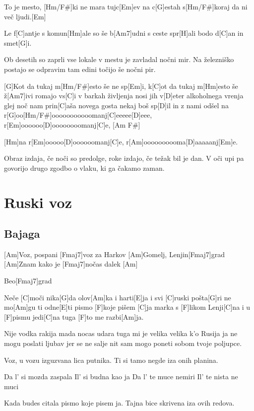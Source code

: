 \documentclass[a4paper,12pt]{article}
\begin{document}
\begin{multicols}{2}
\begin{guitar}
[G]To je mesto, [Hm/F#]ki ne mara tujc[Em]ev
na c[G]estah s[Hm/F#]koraj da ni več ljudi.[Em]

Le f[C]antje s komun[Hm]ale so še b[Am7]udni
s ceste spr[H]ali bodo d[C]an in smet[G]i.
 

Ob desetih so zaprli vse lokale
v mestu je zavladal nočni mir.
Na železniško postajo se odpravim
tam edini točijo še nočni pir.


[G]Kot da tukaj m[Hm/F#]esto še ne sp[Em]i,
k[C]ot da tukaj m[Hm]esto še ž[Am7]ivi
romajo vs[C]i v barkah življenja
nosi jih v[D]eter alkoholnega vrenja
glej noč nam prin[C]aša novega gosta
nekaj boš sp[D]il in z nami odšel
na r[G]oo[Hm/F#]ooooooooooomanj[C]eeeee[D]eee,
r[Em]oooooo[D]oooooooomanj[C]e, [Am F#]

[Hm]na r[Em]ooooo[D]oooooomanj[C]e,
r[Am]oooooooooma[D]aaaaanj[Em]e.


Obraz izdaja, če noči so predolge,
roke izdajo, če težak bil je dan.
V oči upi pa govorijo drugo zgodbo
o vlaku, ki ga čakamo zaman.



\end{guitar}
\section{Ruski voz}
\subsection*{Bajaga}
\begin{guitar}
[Am  Fmaj7]

           
[Am]Voz, pospani [Fmaj7]voz za Harkov
[Am]Gomelj, Lenjin[Fmaj7]grad
[Am]Znam kako je [Fmaj7]nočas dalek [Am]

Beo[Fmaj7]grad



Neče [C]moči nika[G]da olov[Am]ka i harti[E]ja
i svi [C]ruski pošta[G]ri ne mo[Am]gu ti odne[E]ti
pismo [F]koje pišem [C]ja marka s [F]likom Lenji[C]na
i u [F]pismu jedi[C]na tuga [F]to me razbi[Am]ja.


Nije vodka rakija mada nocas udara
tuga mi je velika velika k'o Rusija
ja ne mogu poslati ljubav jer se ne salje
nit sam mogo poneti sobom tvoje poljupce.


Voz, u vozu izguzvana lica putnika.
Ti si tamo negde iza onih planina.


Da l' si mozda zaspala
Il' si budna kao ja
Da l' te muce nemiri
Il' te nista ne muci


Kada budes citala pismo koje pisem ja.
Tajna bice skrivena iza ovih redova.



\end{guitar}
\end{multicols}
\end{document}
